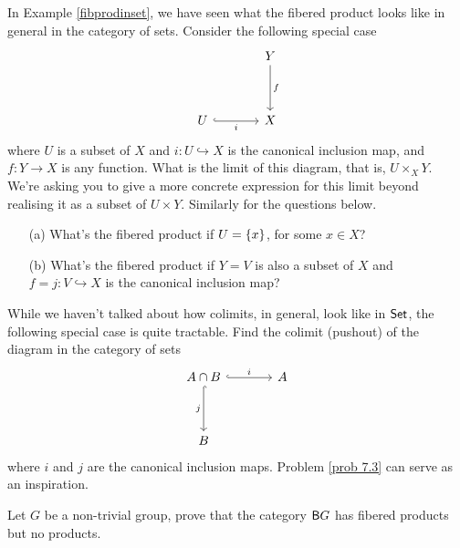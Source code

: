 \begin{problem}\label{prob 7.3a}
In Example \ref{fibprodinset}, we have seen what the fibered product looks like in general in the category of sets. Consider the following special case
\[\begin{tikzcd}[row sep=huge, column sep = large]
 & Y \arrow[d, "f"] \\
U \arrow[r, "i"', hook]                                              & X               
\end{tikzcd}\]
where $U$ is a subset of $X$ and $i:U \hookrightarrow X$ is the canonical inclusion map, and $f: Y \to X$ is any function. What is the limit of this diagram, that is, $U \times_X Y$.\\[0.5em]
We're asking you to give a more concrete expression for this limit beyond realising it as a subset of $U \times Y$. Similarly for the questions below.
\begin{itemize}
\item[(a)] What's the fibered product if $U = \left\{x\right\}$, for some $x \in X$?
\item[(b)] What's the fibered product if $Y = V$ is also a subset of $X$ and $f = j:V \hookrightarrow X$ is the canonical inclusion map?
\end{itemize} 
\end{problem}

\vspace*{0.1in}

\begin{problem}\label{prob 7.3b}
While we haven't talked about how colimits, in general, look like in $\mathsf{Set}$, the following special case is quite tractable. Find the colimit (pushout) of the diagram in the category of sets
\[\begin{tikzcd}[row sep=huge, column sep = large]
A\cap B \arrow[r, "i", hook] \arrow[d, "j"', hook] & A \\
B                                              &            
\end{tikzcd}\]
where $i$ and $j$ are the canonical inclusion maps. Problem \ref{prob 7.3} can serve as an inspiration. 
\end{problem}

\vspace*{0.1in}

\begin{problem}\label{prob 7.3c}
Let $G$ be a non-trivial group, prove that the category $\mathsf{B}G$ has fibered products but no products. 
\end{problem}

